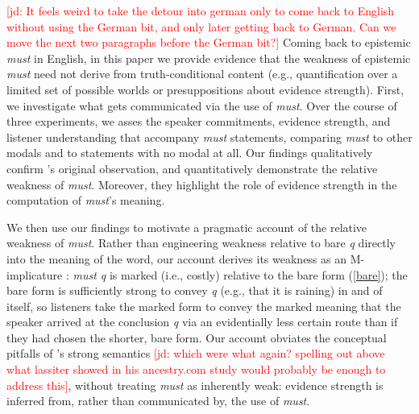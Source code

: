 \documentclass[11pt]{article}
\newcommand{\jd}[1]{\textcolor{Red}{[jd: #1]}}
\begin{document}
\jd{It feels weird to take the detour into german only to come back to English without using the German bit, and only later getting back to German. Can we move the next two paragraphs before the German bit?} Coming back to epistemic \emph{must} in English, in this paper we provide evidence that the weakness of epistemic \emph{must} need not derive from truth-conditional content (e.g., quantification over a limited set of possible worlds or presuppositions about evidence strength). First, we investigate what gets communicated via the use of \emph{must}. Over the course of three experiments, we asses the speaker commitments, evidence strength, and listener understanding that accompany \emph{must} statements, comparing \emph{must} to other modals and to statements with no modal at all. Our findings qualitatively confirm \citeauthor{karttunen1972}'s original observation, and quantitatively demonstrate the relative weakness of \emph{must}. Moreover, they highlight the role of evidence strength in the computation of \emph{must}'s meaning.

We then use our findings to motivate a pragmatic account of the relative weakness of \emph{must}. Rather than engineering weakness relative to bare \emph{q} directly into the meaning of the word, our account derives its weakness as an M-implicature \cite{grice1989,levinson2000}: \emph{must q} is marked (i.e., costly) relative to the bare form (\ref{bare}); the bare form is sufficiently strong to convey \emph{q} (e.g., that it is raining) in and of itself, so listeners take the marked form to convey the marked meaning that the speaker arrived at the conclusion \emph{q} via an evidentially less certain route than if they had chosen the shorter, bare form. Our account obviates the conceptual pitfalls of \citeauthor{vonfintelgillies2010}'s strong semantics \jd{which were what again? spelling out above what lassiter showed in his ancestry.com study would probably be enough to address this}, without treating \emph{must} as inherently weak: evidence strength is inferred from, rather than communicated by, the use of \emph{must}. 
\end{document}
